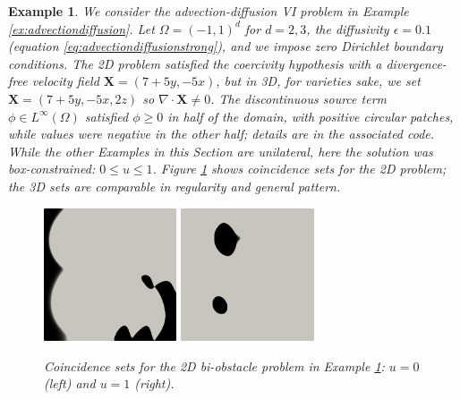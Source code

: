 \documentclass[letterpaper,final,12pt,reqno]{amsart}
\theoremstyle{cstyle}
\theoremstyle{cstyle*}
\theoremstyle{dstyle}
\newtheorem{example}[theorem]{Example}
\numberwithin{equation}{section}
\numberwithin{figure}{section}
\numberwithin{table}{section}
\numberwithin{theorem}{section}
\newcommand{\eps}{\epsilon}
\newcommand{\grad}{\nabla}
\newcommand{\bX}{\mathbf{X}}
\begin{document}
\begin{example}  \label{ex:results:advdiff}
We consider the advection-diffusion VI problem in Example \ref{ex:advectiondiffusion}.  Let $\Omega=(-1,1)^d$ for $d=2,3$, the diffusivity $\eps=0.1$ (equation \eqref{eq:advectiondiffusionstrong}), and we impose zero Dirichlet boundary conditions.  The 2D problem satisfied the coercivity hypothesis with a divergence-free velocity field $\bX = (7+5y,-5x)$, but in 3D, for varieties sake, we set $\bX = (7+5y,-5x,2z)$ so $\grad\cdot\bX \ne 0$.  The discontinuous source term $\phi \in L^\infty(\Omega)$ satisfied $\phi\ge 0$ in half of the domain, with positive circular patches, while values were negative in the other half; details are in the associated code.   While the other Examples in this Section are unilateral, here the solution was box-constrained: $0 \le u \le 1$.  Figure \ref{fig:results:advdiff} shows coincidence sets for the 2D problem; the 3D sets are comparable in regularity and general pattern.

\begin{figure}[ht]
\begin{center}
\includegraphics[width=0.35\textwidth]{fixfigs/poll2d-zero-set.png} \qquad \includegraphics[width=0.35\textwidth]{fixfigs/poll2d-one-set.png}
\end{center}
\caption{Coincidence sets for the 2D bi-obstacle problem in Example \ref{ex:results:advdiff}: $u=0$ (left) and $u=1$ (right).}
\label{fig:results:advdiff}
\end{figure}


\end{example}
\end{document}
